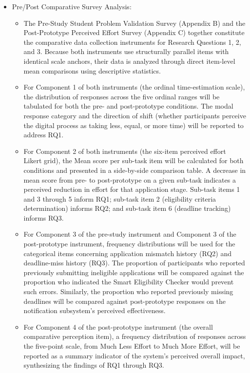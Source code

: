 \begin{itemize}
  \item Pre/Post Comparative Survey Analysis:
  \begin{itemize}
    \item The Pre-Study Student Problem Validation Survey (Appendix B) and the Post-Prototype Perceived Effort Survey (Appendix C) together constitute the comparative data collection instruments for Research Questions 1, 2, and 3. Because both instruments use structurally parallel items with identical scale anchors, their data is analyzed through direct item-level mean comparisons using descriptive statistics.
    \item For Component 1 of both instruments (the ordinal time-estimation scale), the distribution of responses across the five ordinal ranges will be tabulated for both the pre- and post-prototype conditions. The modal response category and the direction of shift (whether participants perceive the digital process as taking less, equal, or more time) will be reported to address RQ1.
    \item For Component 2 of both instruments (the six-item perceived effort Likert grid), the Mean score per sub-task item will be calculated for both conditions and presented in a side-by-side comparison table. A decrease in mean score from pre- to post-prototype on a given sub-task indicates a perceived reduction in effort for that application stage. Sub-task items 1 and 3 through 5 inform RQ1; sub-task item 2 (eligibility criteria determination) informs RQ2; and sub-task item 6 (deadline tracking) informs RQ3.
    \item For Component 3 of the pre-study instrument and Component 3 of the post-prototype instrument, frequency distributions will be used for the categorical items concerning application mismatch history (RQ2) and deadline-miss history (RQ3). The proportion of participants who reported previously submitting ineligible applications will be compared against the proportion who indicated the Smart Eligibility Checker would prevent such errors. Similarly, the proportion who reported previously missing deadlines will be compared against post-prototype responses on the notification subsystem's perceived effectiveness.
    \item For Component 4 of the post-prototype instrument (the overall comparative perception item), a frequency distribution of responses across the five-point scale, from Much Less Effort to Much More Effort, will be reported as a summary indicator of the system's perceived overall impact, synthesizing the findings of RQ1 through RQ3.

\end{itemize}
\end{itemize}
